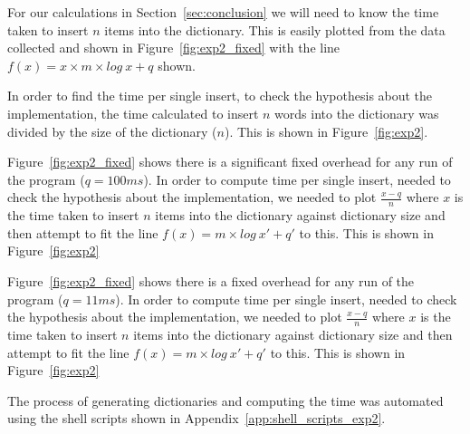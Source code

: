 For our calculations in Section~\ref{sec:conclusion} we will need to know the time taken to insert $n$ items into the dictionary.  This is easily plotted from the data collected and shown in Figure~\ref{fig:exp2_fixed} with the line  $f(x) = x \times m \times log~x + q$ shown.

\ifc In order to find the time per single insert, to check the hypothesis about the implementation, the time calculated to insert $n$ words into the dictionary was divided by the size of the dictionary ($n$). This is shown in Figure~\ref{fig:exp2}.\fi

\ifjava Figure~\ref{fig:exp2_fixed} shows there is a significant fixed overhead for any run of the program ($q = 100ms$). In order to compute time per single insert, needed to check the hypothesis about the implementation, we needed to plot $\frac{x - q}{n}$ where $x$ is the time taken to insert $n$ items into the dictionary against dictionary size and then attempt to fit the line $f(x) = m \times log~x' + q'$ to this.  This is shown in Figure~\ref{fig:exp2}\fi

\ifjava Figure~\ref{fig:exp2_fixed} shows there is a  fixed overhead for any run of the program ($q = 11ms$). In order to compute time per single insert, needed to check the hypothesis about the implementation, we needed to plot $\frac{x - q}{n}$ where $x$ is the time taken to insert $n$ items into the dictionary against dictionary size and then attempt to fit the line $f(x) = m \times log~x' + q'$ to this.  This is shown in Figure~\ref{fig:exp2}\fi

The process of generating dictionaries and computing the time was automated using the shell scripts shown in Appendix~\ref{app:shell_scripts_exp2}.

